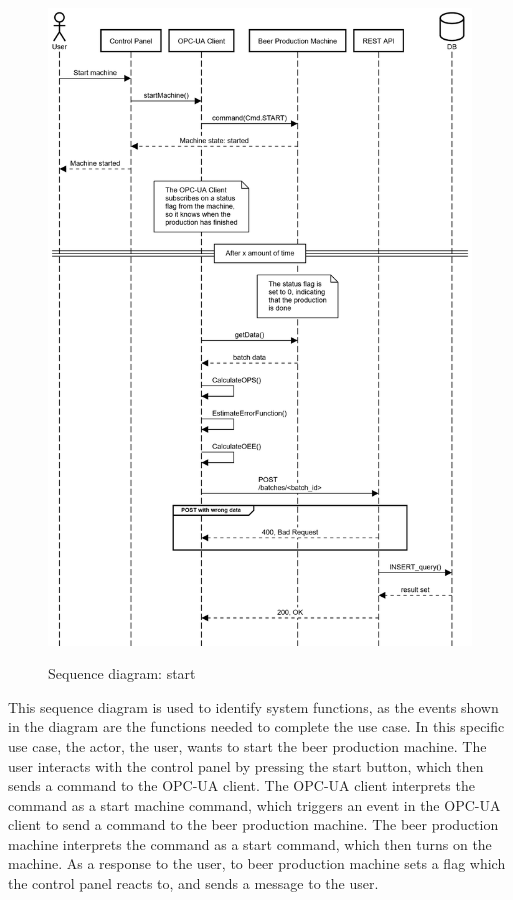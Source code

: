 \begin{figure}[ht]
\centering 
\includegraphics[scale=0.3]{images/sequence_operation/start.png}
\label{figure:sequence_diagram}
\caption{Sequence diagram: start} 
\end{figure}

This sequence diagram is used to identify system functions, as the events shown
in the diagram are the functions needed to complete the use case. In this
specific use case, the actor, the user, wants to start the beer production
machine. The user interacts with the control panel by pressing the start button,
which then sends a command to the OPC-UA client. The OPC-UA client interprets
the command as a start machine command, which triggers an event in the OPC-UA
client to send a command to the beer production machine. The beer production
machine interprets the command as a start command, which then turns on the 
machine. As a response to the user, to beer production machine sets a flag
which the control panel reacts to, and sends a message to the user. \\


